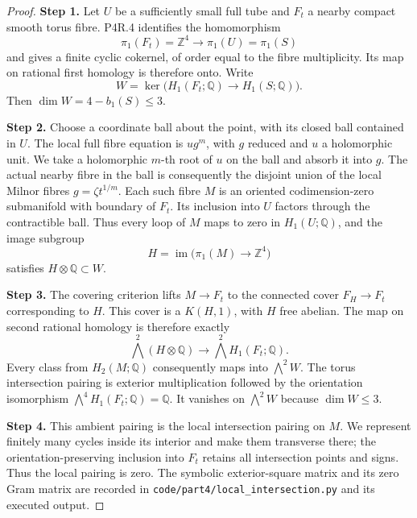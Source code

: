 \begin{proof}
\noindent\textbf{Step 1.} Let $U$ be a sufficiently small full tube and $F_t$ a
nearby compact smooth torus fibre. P4R.4 identifies the
homomorphism
\[
 \pi_1(F_t)=\mathbb Z^4\longrightarrow
 \pi_1(U)=\pi_1(S)
\]
and gives a finite cyclic cokernel, of order equal to
the fibre multiplicity. Its map on rational first
homology is therefore onto. Write
\[
 W=\ker\bigl(H_1(F_t;\mathbb Q)\longrightarrow
                  H_1(S;\mathbb Q)\bigr).
\]
Then $\dim W=4-b_1(S)\le3$.

\noindent\textbf{Step 2.} Choose a coordinate ball about the point, with its
closed ball contained in $U$. The local full fibre
equation is $u g^m$, with $g$ reduced and $u$ a
holomorphic unit. We take a holomorphic $m$-th root of
$u$ on the ball and absorb it into $g$. The actual
nearby fibre in the ball is consequently the disjoint
union of the local Milnor fibres
$g=\zeta t^{1/m}$. Each such fibre $M$ is an oriented
codimension-zero submanifold with boundary of $F_t$.
Its inclusion into $U$ factors through the contractible
ball. Thus every loop of $M$ maps to zero in
$H_1(U;\mathbb Q)$, and the image subgroup
\[
 H=\operatorname{im}\bigl(\pi_1(M)\longrightarrow
                                 \mathbb Z^4\bigr)
\]
satisfies $H\otimes\mathbb Q\subset W$.

\noindent\textbf{Step 3.} The covering criterion lifts $M\to F_t$ to the
connected cover $F_H\to F_t$ corresponding to $H$.
This cover is a $K(H,1)$, with $H$ free abelian. The
map on second rational homology is therefore exactly
\[
 \bigwedge^2(H\otimes\mathbb Q)\longrightarrow
              \bigwedge^2 H_1(F_t;\mathbb Q).
\]
Every class from $H_2(M;\mathbb Q)$ consequently maps
into $\bigwedge^2W$. The torus intersection pairing is
exterior multiplication followed by the orientation
isomorphism $\bigwedge^4H_1(F_t;\mathbb Q)=\mathbb Q$.
It vanishes on $\bigwedge^2W$ because $\dim W\le3$.

\noindent\textbf{Step 4.} This ambient pairing is the local intersection
pairing on $M$. We represent finitely many cycles
inside its interior and make them transverse there;
the orientation-preserving inclusion into $F_t$
retains all intersection points and signs. Thus the
local pairing is zero. The symbolic exterior-square
matrix and its zero Gram matrix are recorded in
\texttt{code/part4/local\_intersection.py} and its
executed output.
\end{proof}

